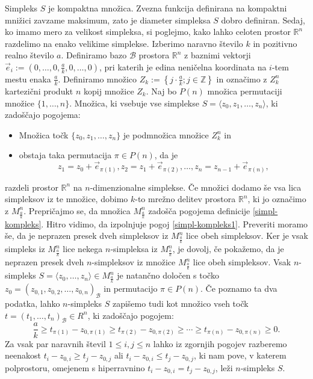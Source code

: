 \documentclass[mat1]{fmfdelo}
\newcommand{\R}{\mathbb R}
\newcommand{\Z}{\mathbb Z}
\newcommand{\0}{0}
\newcommand{\pB}{\mathcal B}
\begin{document}
Simpleks $S$ je kompaktna množica. Zvezna funkcija definirana na kompaktni mnižici zavzame maksimum, zato je diameter simpleksa $S$ dobro definiran.
Sedaj, ko imamo mero za velikost simpleksa, si poglejmo, kako lahko celoten prostor $\R^n$ razdelimo na enako velikime simplekse. Izberimo naravno število $k$ in pozitivno realno število $a$. Definiramo bazo $\pB$ prostora $\R^n$ z baznimi vektorji $\vec{e}_i := (0, \dots, 0, \frac{a}{k}, 0, \dots, 0)$, pri katerih je edina neničelna koordinata na $i$-tem mestu enaka $\frac{a}{k}$. Definiramo množico $Z_k := \left\{ j \cdot \frac{a}{k}; j \in \Z \right\}$ in označimo z $Z_k^n$ kartezični produkt $n$ kopij množice $Z_k$. Naj bo $P(n)$ množica permutaciji množice $\{1, \dots, n \}$.
Množica, ki vsebuje vse simplekse $S = \langle z_0, z_1, \dots, z_n \rangle$, ki zadoščajo pogojema:
\begin{itemize}
\item Množica točk $\{ z_0, z_1, \dots, z_n \}$ je podmnožica množice $Z_k^n$ in
\item obstaja taka permutacija $\pi \in P(n)$, da je 
\begin{equation*}
z_1 = z_0 + \vec{e}_{\pi(1)}, z_2 = z_1 + \vec{e}_{\pi(2)}, \dots, z_n = z_{n-1} + \vec{e}_{\pi(n)},
\end{equation*}
\end{itemize}
razdeli prostor $\R^n$ na $n$-dimenzionalne simplekse.
Če množici dodamo še vsa lica simpleksov iz te množice, dobimo $k$-to mrežno delitev prostora $\R^n$, ki jo označimo z $M_{\frac{a}{k}}^n$.
Prepričajmo se, da množica $M_{\frac{a}{k}}^n$ zadošča pogojema definicije \ref{simpl-kompleks}. Hitro vidimo, da izpolnjuje pogoj \eqref{simpl-kompleks1}. Preveriti moramo še, da je neprazen presek dveh simpleksov iz $M_{\frac{a}{k}}^n$ lice obeh simpleksov. Ker je vsak simpleks iz $M_{\frac{a}{k}}^n$ lice nekega $n$-simpleksa iz $M_{\frac{a}{k}}^n$, je dovolj, če pokažemo, da je neprazen presek dveh $n$-simpleksov iz množice $M_{\frac{a}{k}}^n$ lice obeh simpleksov. Vsak $n$-simpleks $S = \langle z_0, \dots, z_n \rangle \in  M_{\frac{a}{k}}^n$ je natančno določen s točko $z_0 = (z_{0,1}, z_{0, 2}, \dots, z_{0,n})_{\pB}$ in permutacijo $\pi \in P(n)$. Če poznamo ta dva podatka, lahko $n$-simpleks $S$ zapišemo tudi kot množico vseh točk $t=(t_1, \dots, t_n)_{\pB} \in R^n$, ki zadoščajo pogojem:
$$\frac{a}{k} \geq t_{\pi(1)} - z_{0, \pi(1)}  \geq t_{\pi(2)} - z_{0, \pi(2)} \geq \cdots \geq t_{\pi(n)} - z_{0, \pi(n)} \geq 0.$$
Za vsak par naravnih števil $1 \leq i, j \leq n$ lahko iz zgornjih pogojev razberemo neenakost $t_i - z_{0, i}  \geq t_j - z_{0, j}$ ali $t_i - z_{0, i}  \leq t_j - z_{0, j}$, ki nam pove, v katerem polprostoru, omejenem s hiperravnino $t_i - z_{0, i} = t_j - z_{0, j}$, leži $n$-simpleks $S$.
\end{document}
